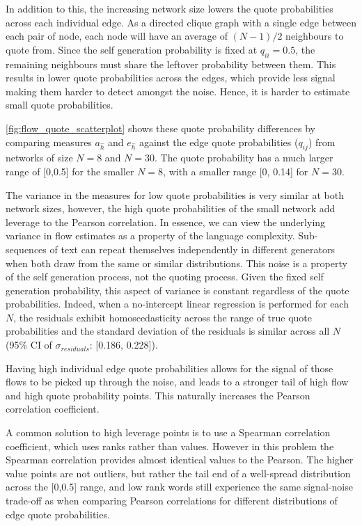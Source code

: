 In addition to this, the increasing network size lowers the quote probabilities across each individual edge. As a directed clique graph with a single edge between each pair of node, each node will have an average of $(N-1)/2$ neighbours to quote from. Since the self generation probability is fixed at $q_{ii}=0.5$, the remaining neighbours must share the leftover probability between them. This results in lower quote probabilities across the edges, which provide less signal making them harder to detect amongst the noise. Hence, it is harder to estimate small quote probabilities.

\autoref{fig:flow_quote_scatterplot} shows these quote probability differences by comparing measures $a_{\hat{h}}$ and $e_{\hat{h}}$ against the edge quote probabilities ($q_{ij}$) from networks of size $N=8$ and $N=30$. The quote probability has a much larger range of [0,0.5] for the smaller $N=8$, with a smaller range [0, 0.14] for $N=30$.

The variance in the measures for low quote probabilities is very similar at both network sizes, however, the high quote probabilities of the small network add leverage to the Pearson correlation. In essence, we can view the underlying variance in flow estimates as a property of the language complexity. Sub-sequences of text can repeat themselves independently in different generators when both draw from the same or similar distributions. This noise is a property of the self generation process, not the quoting process. Given the fixed self generation probability, this aspect of variance is constant regardless of the quote probabilities. Indeed, when a no-intercept linear regression is performed for each $N$, the residuals exhibit homoscedasticity across the range of true quote probabilities and the standard deviation of the residuals is similar across all $N$ (95\% CI of $\sigma_{residuals}$: [0.186, 0.228]). 

Having high individual edge quote probabilities allows for the signal of those flows to be picked up through the noise, and leads to a stronger tail of high flow and high quote probability points. This naturally increases the Pearson correlation coefficient.

A common solution to high leverage points is to use a Spearman correlation coefficient, which uses ranks rather than values. However in this problem the Spearman correlation provides almost identical values to the Pearson. The higher value points are not outliers, but rather the tail end of a well-spread distribution across the [0,0.5] range, and low rank words still experience the same signal-noise trade-off as when comparing Pearson correlations for different distributions of edge quote probabilities.



